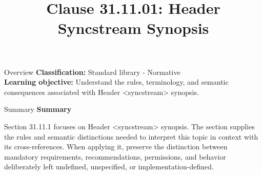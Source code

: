 \documentclass[10pt,letterpaper]{article}
\title{Clause 31.11.01: Header Syncstream Synopsis}
\author{}
\date{}
\begin{document}
\maketitle
\begin{CornellOverviewBox}{Overview}
\textbf{Classification:} Standard library - Normative\\[2pt]
\textbf{Learning objective:} Understand the rules, terminology, and semantic consequences associated with Header <syncstream> synopsis.
\end{CornellOverviewBox}\begin{CornellSummaryBox}{Summary}
{\sffamily\bfseries\color{Accent} Summary}\par\vspace{3pt}Section 31.11.1 focuses on Header <syncstream> synopsis. The section supplies the rules and semantic distinctions needed to interpret this topic in context with its cross-references. When applying it, preserve the distinction between mandatory requirements, recommendations, permissions, and behavior deliberately left undefined, unspecified, or implementation-defined.
\end{CornellSummaryBox}
\end{document}
